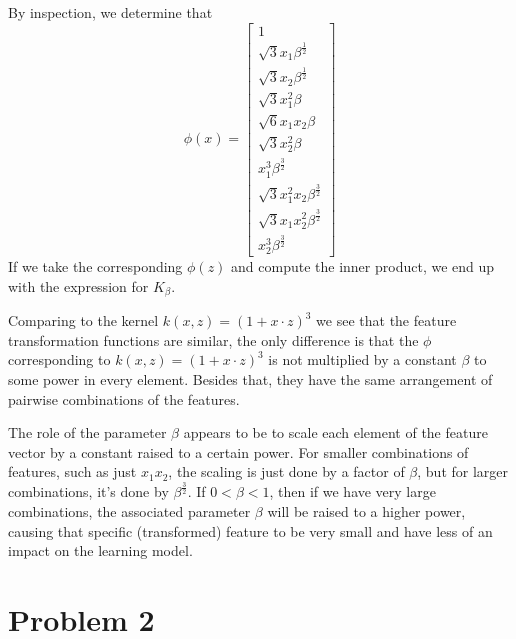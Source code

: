 \documentclass[11pt]{article}
\begin{document}
\begin{enumerate}
{By inspection, we determine that \[ \phi(x) = \begin{bmatrix} 1 \\ \sqrt{3}x_1 \beta^{\frac{1}{2}} \\ \sqrt{3}x_2 \beta^{\frac{1}{2}} \\ \sqrt{3} x_1^2 \beta \\ \sqrt{6}x_1 x_2 \beta \\ \sqrt{3} x_2^2 \beta \\x_1^3 \beta^{\frac{3}{2}} \\ \sqrt{3}x_1^2 x_2 \beta^{\frac{3}{2}} \\ \sqrt{3}x_1 x_2^{2} \beta^{\frac{3}{2}} \\ x_2^3 \beta^{\frac{3}{2}} \end{bmatrix} \] If we take the corresponding $\phi(z)$ and compute the inner product, we end up with the expression for $K_{\beta}$. \newline{}

Comparing to the kernel $k(x,z) = (1 + x \cdot z)^3 $ we see that the feature transformation functions are similar, the only difference is that the $\phi$ corresponding to $k(x,z) = (1 + x \cdot z)^3 $ is not multiplied by a constant $\beta$ to some power in every element. Besides that, they have the same arrangement of pairwise combinations of the features. \newline{}

The role of the parameter $\beta$ appears to be to scale each element of the feature vector by a constant raised to a certain power. For smaller combinations of features, such as just $x_1 x_2$, the scaling is just done by a factor of $\beta$, but for larger combinations, it's done by $\beta^{\frac{3}{2}}$. If $ 0 < \beta < 1$, then if we have very large combinations, the associated parameter $\beta$ will be raised to a higher power, causing that specific (transformed) feature to be very small and have less of an impact on the learning model. 
}
\end{enumerate}

\newpage
\section{Problem 2}
\end{document}
